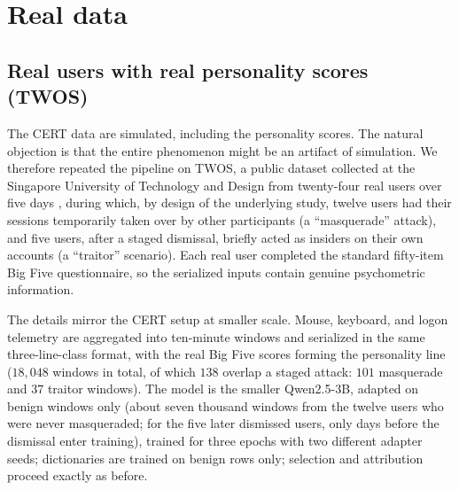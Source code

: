 \documentclass[10pt]{article} %
\begin{document}
\section{Real data}
\label{sec:realdata}

\subsection{Real users with real personality scores (TWOS)}
\label{sec:twos}

The CERT data are simulated, including the personality scores. The
natural objection is that the entire phenomenon might be an artifact of
simulation. We therefore repeated the pipeline on TWOS, a public
dataset collected at the Singapore University of Technology and Design
from twenty-four real users over five days \citep{harilal2017twos}, during which, by design of
the underlying study, twelve users had their sessions temporarily taken
over by other participants (a ``masquerade'' attack), and five users,
after a staged dismissal, briefly acted as insiders on their own accounts
(a ``traitor'' scenario). Each real user
completed the standard fifty-item Big Five questionnaire, so the
serialized inputs contain genuine psychometric information.

The details mirror the CERT setup at smaller scale. Mouse, keyboard,
and logon telemetry are aggregated into ten-minute windows and
serialized in the same three-line-class format, with the real Big Five
scores forming the personality line ($18{,}048$ windows in total, of
which $138$ overlap a staged attack: $101$ masquerade and $37$ traitor
windows). The model is the smaller
Qwen2.5-3B, adapted on benign windows only (about seven thousand windows
from the twelve users who were never masqueraded; for the five later
dismissed users, only days before the dismissal enter training), trained for three epochs with two different adapter seeds; dictionaries are trained on benign rows only;
selection and attribution proceed exactly as before.
\end{document}
